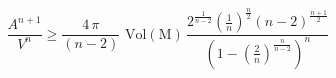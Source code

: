 \begin{equation}
\frac{A^{n+1}}{V^n} \ge
\frac{4\,\pi}{(n-2)}\,\,\mathrm{Vol(M)}\,\frac{2^{\frac{1}{n-2}}(\frac{1}{n})^{\frac{n}{2}}(n-2)^{\frac{n+1}{2}}}{\left(1-(\frac{2}{n})^{\frac{n}{n-2}}
\right)^n}\label{Schineqn2}
\end{equation}

